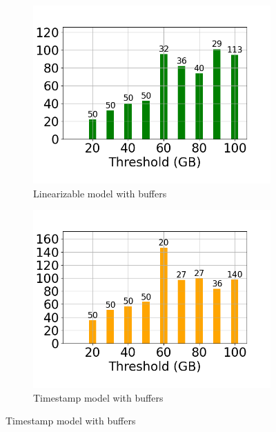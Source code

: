 \begin{figure}
	\centering
	\begin{subfigure}[c]{0.48\textwidth}
		\includegraphics[width=1\textwidth]   {figures/Experiments/Dynamic/Progress/3/average_query_time_per_batch_version_999777015_10485760_10_delay[3].png}
		\caption{Linearizable model with buffers}
		\label{fig:progress-queries-3-logical}
	\end{subfigure}
	\begin{subfigure}[c]{0.48\textwidth}
		\includegraphics[width=1\textwidth]   {figures/Experiments/Dynamic/Progress/3/average_query_time_per_batch_version_999777018_10485760_10_delay[3].png}
		\caption{Timestamp model with buffers}

\end{subfigure}
\end{figure}

